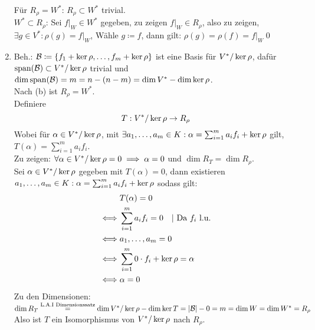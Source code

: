 \documentclass[sectionformat = aufgabe]{gadsescript}
\begin{document}
\begin{enumerate}[label=(\alph*)]
		Für $ R_\rho = W^* $: $ R_\rho \subset W^* $ trivial.\\
		$ W^* \subset R_\rho $: Sei $ f|_W \in W^* $ gegeben, zu zeigen $ f|_W \in R_\rho $, also zu zeigen, $ \exists g \in V^* : \rho(g) = f|_W $, Wähle $ g \coloneqq f $, dann gilt: $ \rho(g) = \rho(f) = f|_W $\qed
	\item Beh.: $ \mathcal{B} \coloneqq \left\{ f_1 + \operatorname{ker} \rho, \dotsc, f_m + \operatorname{ker} \rho \right\}  $ ist eine Basis für $ V^* / \operatorname{ker} \rho $, dafür $ \operatorname{span}(\mathcal{B} ) \subset V^* / \operatorname{ker} \rho $ trivial und  $ \dim \operatorname{span} (\mathcal{B} ) = m = n - (n - m) = \dim V^* - \dim \operatorname{ker} \rho $.\\
		Nach (b) ist $ R_\rho = W^* $.\\
		Definiere
		\[
			T: V^* / \operatorname{ker} \rho \to R_\rho
		\]
		Wobei für $ \alpha \in V^* / \operatorname{ker} \rho $, mit $ \exists a_1, \dotsc, a_m \in K : \alpha = \sum_{i=1}^{m} a_if_i + \operatorname{ker} \rho $ gilt, $ T(\alpha) = \sum_{i=1}^{m} a_if_i $.\\
		Zu zeigen: $ \forall \alpha \in V^* / \operatorname{ker} \rho = 0 \implies \alpha = 0 $ und $ \dim R_T = \dim R_\rho $.\\
		Sei $ \alpha \in V^* / \operatorname{ker} \rho $ gegeben mit $ T(\alpha) = 0 $, dann existieren $ a_1, \dotsc, a_m \in K : \alpha = \sum_{i=1}^{m} a_i f_i + \operatorname{ker} \rho $ sodass gilt:
		\begin{align*}
			& T(\alpha) = 0\\
			\iff & \sum_{i=1}^{m} a_if_i = 0 \quad | \text{ Da $ f_i $ l.u.} \\
			\iff & a_1, \dotsc, a_m = 0 \\
			\iff & \sum_{i=1}^{m} 0 \cdot f_i + \operatorname{ker} \rho = \alpha\\
			\iff & \alpha = 0
		\end{align*}
		Zu den Dimensionen:
		$ \dim R_T \overset{\text{L.A.I Dimensionssatz} }{=} \dim V^* / \operatorname{ker} \rho - \dim \operatorname{ker} T = \left| \mathcal{B}  \right| - 0 = m = \dim W = \dim W^* = R_\rho $\\
		Also ist $ T $ ein Isomorphismus von $ V^* / \operatorname{ker} \rho $ nach $ R_\rho $.
\end{enumerate}
\end{document}
